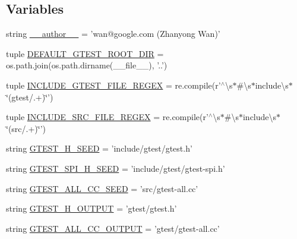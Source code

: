 \subsection*{Variables}
\begin{DoxyCompactItemize}
\item 
string \hyperlink{namespacefuse__gtest__files_a33bf00338164b922cf67f159e3cded19}{\-\_\-\-\_\-author\-\_\-\-\_\-} = 'wan@google.\-com (Zhanyong Wan)'
\item 
tuple \hyperlink{namespacefuse__gtest__files_a082a3579288a4359dbf6ad10a74e1726}{D\-E\-F\-A\-U\-L\-T\-\_\-\-G\-T\-E\-S\-T\-\_\-\-R\-O\-O\-T\-\_\-\-D\-I\-R} = os.\-path.\-join(os.\-path.\-dirname(\-\_\-\-\_\-file\-\_\-\-\_\-), '..')
\item 
tuple \hyperlink{namespacefuse__gtest__files_a726853d43863f4f03df04d2fbc3e5d12}{I\-N\-C\-L\-U\-D\-E\-\_\-\-G\-T\-E\-S\-T\-\_\-\-F\-I\-L\-E\-\_\-\-R\-E\-G\-E\-X} = re.\-compile(r'$^\wedge$\textbackslash{}s$\ast$\#\textbackslash{}s$\ast$include\textbackslash{}s$\ast$\char`\"{}(gtest/.+)\char`\"{}')
\item 
tuple \hyperlink{namespacefuse__gtest__files_ada118f67eab8eccd71bfac9e6508245b}{I\-N\-C\-L\-U\-D\-E\-\_\-\-S\-R\-C\-\_\-\-F\-I\-L\-E\-\_\-\-R\-E\-G\-E\-X} = re.\-compile(r'$^\wedge$\textbackslash{}s$\ast$\#\textbackslash{}s$\ast$include\textbackslash{}s$\ast$\char`\"{}(src/.+)\char`\"{}')
\item 
string \hyperlink{namespacefuse__gtest__files_ad897bce28100f2b97216929013519181}{G\-T\-E\-S\-T\-\_\-\-H\-\_\-\-S\-E\-E\-D} = 'include/gtest/gtest.\-h'
\item 
string \hyperlink{namespacefuse__gtest__files_a891d03ce9cfe3577cb4c193f9544f17f}{G\-T\-E\-S\-T\-\_\-\-S\-P\-I\-\_\-\-H\-\_\-\-S\-E\-E\-D} = 'include/gtest/gtest-\/spi.\-h'
\item 
string \hyperlink{namespacefuse__gtest__files_a162a6031d0d5743a37a4f79227d5e916}{G\-T\-E\-S\-T\-\_\-\-A\-L\-L\-\_\-\-C\-C\-\_\-\-S\-E\-E\-D} = 'src/gtest-\/all.\-cc'
\item 
string \hyperlink{namespacefuse__gtest__files_a16437f87d0f7a9800885a9082a0b773e}{G\-T\-E\-S\-T\-\_\-\-H\-\_\-\-O\-U\-T\-P\-U\-T} = 'gtest/gtest.\-h'
\item 
string \hyperlink{namespacefuse__gtest__files_aa66c14474599109c46ec24eaa0ad4217}{G\-T\-E\-S\-T\-\_\-\-A\-L\-L\-\_\-\-C\-C\-\_\-\-O\-U\-T\-P\-U\-T} = 'gtest/gtest-\/all.\-cc'
\end{DoxyCompactItemize}


